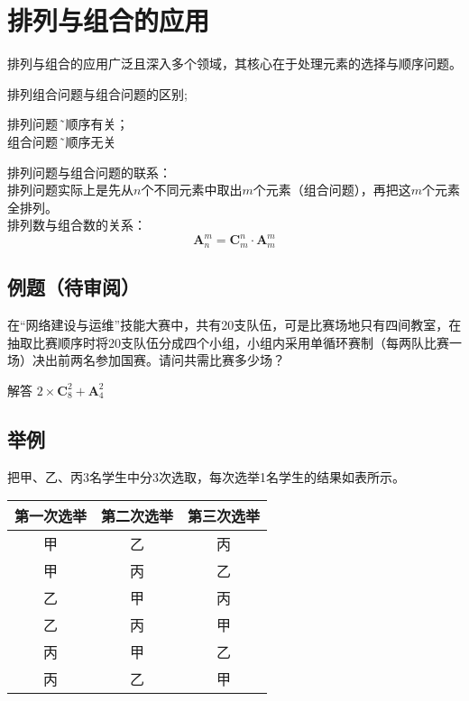 \section{\textbf{排列与组合的应用}}

排列与组合的应用广泛且深入多个领域，其核心在于处理元素的选择与顺序问题。

排列组合问题与组合问题的区别;
\begin{center}
    排列问题 \~ 与顺序有关； \\
    组合问题 \~ 与顺序无关
\end{center}

排列问题与组合问题的联系：\\
排列问题实际上是先从$n$个不同元素中取出$m$个元素（组合问题），再把这$m$个元素全排列。\\
排列数与组合数的关系：\\
\begin{equation}
    \textbf{A}_{n}^m = \textbf{C}_{m}^n \cdot \textbf{A}_{m}^{m}
\end{equation}

\subsection{例题（待审阅）}
在“网络建设与运维”技能大赛中，共有20支队伍，可是比赛场地只有四间教室，在抽取比赛顺序时将20支队伍分成四个小组，小组内采用单循环赛制（每两队比赛一场）决出前两名参加国赛。请问共需比赛多少场？

{\color{blue} 解答} $2\times{}\textbf{C}_{8}^{2}+\textbf{A}_{4}^{2}$

\subsection{举例}

把甲、乙、丙3名学生中分3次选取，每次选举1名学生的结果如表所示。

\begin{center}
\begin{tabular}{|c|c|c|}
	\hline
	第一次选举 & 第二次选举 & 第三次选举 \\
	\hline
	甲 & 乙 & 丙 \\
	甲 & 丙 & 乙 \\
	乙 & 甲 & 丙 \\
	乙 & 丙 & 甲 \\
	丙 & 甲 & 乙 \\
	丙 & 乙 & 甲 \\
	\hline
\end{tabular}
\end{center}

